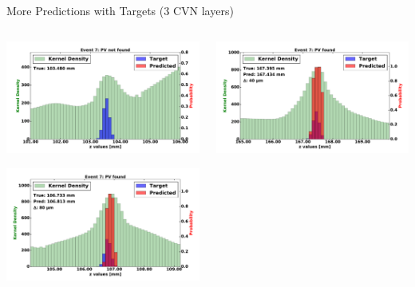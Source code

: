 \begin{frame}{More Predictions with Targets (3 CVN layers)}
  \begin{columns}[c]
        \begin{center}
            \includegraphics[width=1\textwidth,height=0.45\textwidth, trim=18 0 18 0]{images/120000_3layer_45.pdf}

            \includegraphics[width=1\textwidth, height=0.45\textwidth,trim=18 0 18 0]{images/120000_3layer_46.pdf}

        \end{center}
        \begin{center}
           \includegraphics[width=1\textwidth, height=0.45\textwidth, trim=18 0 18 0]{images/120000_3layer_47.pdf}


\end{center}
\end{columns}
\end{frame}
